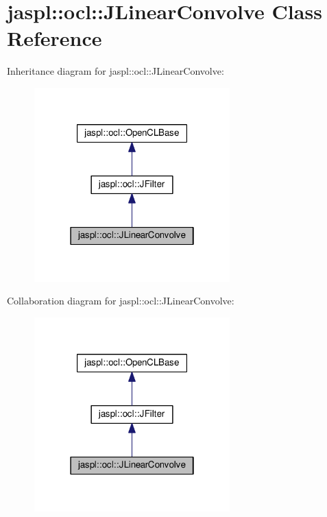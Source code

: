 \hypertarget{classjaspl_1_1ocl_1_1_j_linear_convolve}{}\section{jaspl\+:\+:ocl\+:\+:J\+Linear\+Convolve Class Reference}
\label{classjaspl_1_1ocl_1_1_j_linear_convolve}


Inheritance diagram for jaspl\+:\+:ocl\+:\+:J\+Linear\+Convolve\+:
\nopagebreak
\begin{figure}[H]
\begin{center}
\leavevmode
\includegraphics[width=214pt]{classjaspl_1_1ocl_1_1_j_linear_convolve__inherit__graph}
\end{center}
\end{figure}


Collaboration diagram for jaspl\+:\+:ocl\+:\+:J\+Linear\+Convolve\+:
\nopagebreak
\begin{figure}[H]
\begin{center}
\leavevmode
\includegraphics[width=214pt]{classjaspl_1_1ocl_1_1_j_linear_convolve__coll__graph}
\end{center}
\end{figure}
